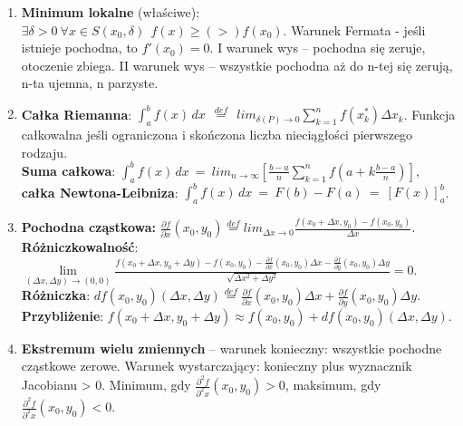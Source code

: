 \documentclass[12pt]{article}
\begin{document}
\begin{enumerate}
        \item \textbf{Minimum lokalne} (właściwe): $\exists \delta > 0 ~ \forall x \in S(x_0, \delta) ~~ f(x) \geq (>) f(x_0)$.
        Warunek Fermata - jeśli istnieje pochodna, to $f'(x_0) = 0$.
        I warunek wys -- pochodna się zeruje, otoczenie zbiega.
        II warunek wys -- wszystkie pochodna aż do n-tej się zerują, n-ta ujemna, n parzyste.

        \item \textbf{Całka Riemanna}: $\int_{a}^{b} f(x) \,dx ~~ \stackrel{def}{=} ~~ lim_{\delta(P)  \rightarrow 0} \sum_{k=1}^{n} f(x^{*}_k) \Delta x_k$.
        Funkcja całkowalna jeśli ograniczona i skończona liczba nieciągłości pierwszego rodzaju.\\
        \textbf{Suma całkowa}: $\int_{a}^b f(x) \, dx ~ = ~ lim_{n \rightarrow \infty} [\frac{b - a}{n} \sum_{k=1}^n f \left(a + k \frac{b - a}{n}\right)]$,\\
        \textbf{całka Newtona-Leibniza}: $\int_a^b f(x) \,dx ~ = ~ F(b) - F(a) ~ = ~ [F(x)]_a^b$.

        \item \textbf{Pochodna cząstkowa:} $\frac{\partial f}{\partial x}(x_0, y_0)  \stackrel{def}{=} lim_{\Delta x \rightarrow 0} \frac{f(x_0 + \Delta x, y_0) - f(x_0, y_0)}{\Delta x}$.\\
        \textbf{Różniczkowalność}: $\underset{(\Delta x,  \Delta y) \rightarrow (0,0)}{\lim} \frac{f(x_0 + \Delta x, y_0 +  \Delta y) - f(x_0, y_0) - \frac{\partial f}{\partial x}(x_0, y_0)\Delta x - \frac{\partial f}{\partial y}(x_0, y_0) \Delta y}{\sqrt{\Delta x^2 +  \Delta y^2}} = 0$.\\
        \textbf{Różniczka}: $df(x_0, y_0)(\Delta x, \Delta y) \stackrel{def}{=} \frac{\partial f}{\partial x}(x_0, y_0)\Delta x + \frac{\partial f}{\partial y}(x_0, y_0)\Delta y$.\\
        \textbf{Przybliżenie}: $f(x_0 + \Delta x, y_0 + \Delta y) \approx f(x_0, y_0) + df(x_0, y_0)(\Delta x, \Delta y)$.

        \item \textbf{Ekstremum wielu zmiennych} -- warunek konieczny: wszystkie pochodne cząstkowe zerowe.
        Warunek wystarczający: konieczny plus wyznacznik Jacobianu > 0.
        Minimum, gdy $\frac{\partial^2 f}{\partial^2 x}(x_0, y_0) > 0$,
        maksimum, gdy $\frac{\partial^2 f}{\partial^2 x}(x_0, y_0) < 0$.


\end{enumerate}
\end{document}
